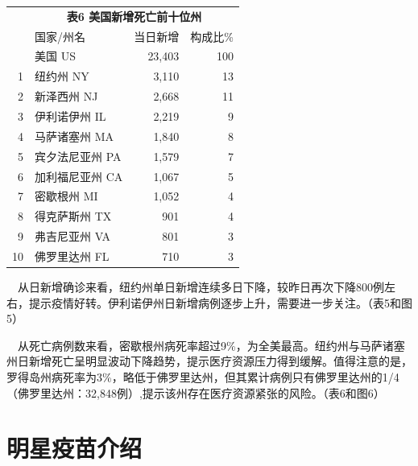 \documentclass[
]{article}
\begin{document}
\begin{table}[H]
\begin{table}[H]
\begin{tabular}{rlrr}
\toprule
\multicolumn{0}{c}{\textbf{ }} & \multicolumn{3}{c}{\textbf{表6 美国新增死亡前十位州}} \\
  & 国家/州名 & 当日新增 & 构成比\%\\
\midrule
\rowcolor{gray!6}   & 美国 US & 23,403 & 100\\
1 & 纽约州 NY & 3,110 & 13\\
\rowcolor{gray!6}  2 & 新泽西州 NJ & 2,668 & 11\\
3 & 伊利诺伊州 IL & 2,219 & 9\\
\rowcolor{gray!6}  4 & 马萨诸塞州 MA & 1,840 & 8\\
5 & 宾夕法尼亚州 PA & 1,579 & 7\\
\rowcolor{gray!6}  6 & 加利福尼亚州 CA & 1,067 & 5\\
7 & 密歇根州 MI & 1,052 & 4\\
\rowcolor{gray!6}  8 & 得克萨斯州 TX & 901 & 4\\
9 & 弗吉尼亚州 VA & 801 & 3\\
\rowcolor{gray!6}  10 & 佛罗里达州 FL & 710 & 3\\
\bottomrule
\end{tabular}
\endgroup{}
\end{table} \begin{tablenotes}
        \fontsize{15}{15}
        \selectfont
        \item 
      \end{tablenotes}
\end{table}

\(\quad\)从日新增确诊来看，纽约州单日新增连续多日下降，较昨日再次下降800例左右，提示疫情好转。伊利诺伊州日新增病例逐步上升，需要进一步关注。（表5和图5）

\(\quad\)从死亡病例数来看，密歇根州病死率超过9\%，为全美最高。纽约州与马萨诸塞州日新增死亡呈明显波动下降趋势，提示医疗资源压力得到缓解。值得注意的是，罗得岛州病死率为3\%，略低于佛罗里达州，但其累计病例只有佛罗里达州的1/4（佛罗里达州：32,848例）,提示该州存在医疗资源紧张的风险。（表6和图6）

\vspace{5mm}

%
  \noindent{}%

\vspace{-5mm}

\hypertarget{section-4}{%
\section{\texorpdfstring{\textcolor{glaucous}{\Huge 明星疫苗介绍}}{}}\label{section-4}}
\end{document}
